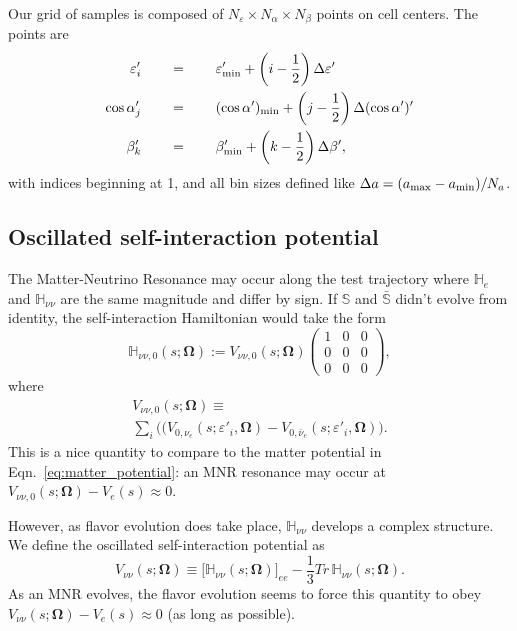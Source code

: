 \documentclass[aps,prd,twocolumn,superscriptaddress,groupedaddress]{revtex4}
\begin{document}
Our grid of samples is composed of
$N_\varepsilon \times N_\alpha \times N_\beta$ points on cell centers.
The points are
\begin{align}
  \varepsilon'_i \qquad&=\qquad \varepsilon'_{\rm min}
  +\left(i-\frac{1}{2}\right)\Delta\varepsilon' \nonumber \\
  \cos\alpha'_j  \qquad&=\qquad (\cos\alpha')_{\rm min}
  +\left(j-\frac{1}{2}\right)\Delta(\cos\alpha')' \nonumber \\
  \beta'_k       \qquad&=\qquad \beta'_{\rm min}
  +\left(k-\frac{1}{2}\right)\Delta\beta', \nonumber
\end{align}
with indices beginning at 1, and all bin sizes defined like
$\Delta a=(a_{\rm max}-a_{\rm min})/N_a$.

\subsection*{Oscillated self-interaction potential}
The Matter-Neutrino Resonance may occur along the test trajectory
where $\mathbb{H}_e$ and $\mathbb{H}_{\nu\nu}$ are the same
magnitude and differ by sign. If $\mathbb{S}$ and $\bar{\mathbb{S}}$ didn't
evolve from identity, the self-interaction Hamiltonian would take the form
\begin{equation}
  \mathbb{H}_{\nu\nu,0}(s;\bm{\Omega}) :=
  V_{\nu\nu,0}(s;\bm{\Omega})
  \left(
  \begin{matrix}
    1 & 0 & 0 \\
    0 & 0 & 0 \\
    0 & 0 & 0
  \end{matrix}
  \right),
\end{equation}
where
\begin{multline}
  V_{\nu\nu,0}(s;\bm{\Omega}) \equiv \\
  \sum\limits_i
  \big((V_{0,\nu_e}(s;\varepsilon'_i,\bm{\Omega})
  -V_{0,\bar{\nu}_e}(s;\varepsilon'_i,\bm{\Omega})\big).
\end{multline}
This is a nice quantity to compare to the matter potential
in Eqn.~\ref{eq:matter_potential}: an MNR resonance may occur at
$V_{\nu\nu,0}(s;\bm{\Omega})-V_e(s)\approx0$.

However, as flavor evolution does take place, $\mathbb{H}_{\nu\nu}$
develops a complex structure.
We define the oscillated self-interaction potential as
\begin{equation}
  V_{\nu\nu}(s;\bm{\Omega}) \equiv
  \big[\mathbb{H}_{\nu\nu}(s;\bm{\Omega})\big]_{ee}
  - \frac{1}{3}Tr\,\mathbb{H}_{\nu\nu}(s;\bm{\Omega}).
\end{equation}
As an MNR evolves, the flavor evolution seems to force this quantity to obey
$V_{\nu\nu}(s;\bm{\Omega})-V_e(s)\approx0$
(as long as possible).


\end{document}
